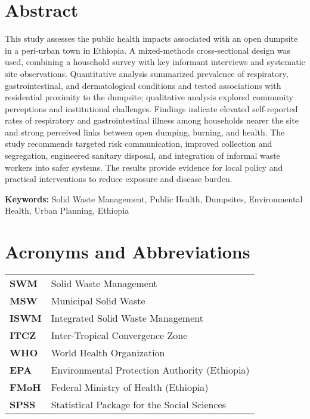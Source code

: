 
\chapter*{Abstract}
This study assesses the public health impacts associated with an open dumpsite in a peri-urban town in Ethiopia. A mixed-methods cross-sectional design was used, combining a household survey with key informant interviews and systematic site observations. Quantitative analysis summarized prevalence of respiratory, gastrointestinal, and dermatological conditions and tested associations with residential proximity to the dumpsite; qualitative analysis explored community perceptions and institutional challenges. Findings indicate elevated self-reported rates of respiratory and gastrointestinal illness among households nearer the site and strong perceived links between open dumping, burning, and health. The study recommends targeted risk communication, improved collection and segregation, engineered sanitary disposal, and integration of informal waste workers into safer systems. The results provide evidence for local policy and practical interventions to reduce exposure and disease burden.

\vspace{2em}
\noindent\textbf{Keywords:} Solid Waste Management, Public Health, Dumpsites, Environmental Health, Urban Planning, Ethiopia

\clearpage

\chapter*{Acronyms and Abbreviations}
\begin{tabularx}{0.8\textwidth}{@{} l Y @{}}
\toprule
\textbf{SWM} & Solid Waste Management\\
\textbf{MSW} & Municipal Solid Waste\\
\textbf{ISWM} & Integrated Solid Waste Management\\
\textbf{ITCZ} & Inter-Tropical Convergence Zone\\
\textbf{WHO} & World Health Organization\\
\textbf{EPA} & Environmental Protection Authority (Ethiopia)\\
\textbf{FMoH} & Federal Ministry of Health (Ethiopia)\\
\textbf{SPSS} & Statistical Package for the Social Sciences\\
\bottomrule
\end{tabularx}
